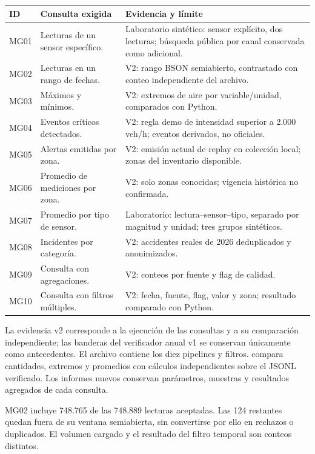 \begin{longtable}{>{\raggedright\arraybackslash}p{}>{\raggedright\arraybackslash}p{}>{\raggedright\arraybackslash}p{}}
\toprule ID & Consulta exigida & Evidencia y límite \\
\midrule\endhead
MG01 & Lecturas de un sensor específico. & Laboratorio sintético: sensor explícito, dos lecturas; búsqueda pública por canal conservada como adicional. \\
MG02 & Lecturas en un rango de fechas. & V2: rango BSON semiabierto, contrastado con conteo independiente del archivo. \\
MG03 & Máximos y mínimos. & V2: extremos de aire por variable/unidad, comparados con Python. \\
MG04 & Eventos críticos detectados. & V2: regla demo de intensidad superior a 2.000 veh/h; eventos derivados, no oficiales. \\
MG05 & Alertas emitidas por zona. & V2: emisión actual de replay en colección local; zonas del inventario disponible. \\
MG06 & Promedio de mediciones por zona. & V2: solo zonas conocidas; vigencia histórica no confirmada. \\
MG07 & Promedio por tipo de sensor. & Laboratorio: lectura--sensor--tipo, separado por magnitud y unidad; tres grupos sintéticos. \\
MG08 & Incidentes por categoría. & V2: accidentes reales de 2026 deduplicados y anonimizados. \\
MG09 & Consulta con agregaciones. & V2: conteos por fuente y flag de calidad. \\
MG10 & Consulta con filtros múltiples. & V2: fecha, fuente, flag, valor y zona; resultado comparado con Python. \\
\bottomrule
\end{longtable}

La evidencia v2 corresponde a la ejecución de las consultas y a su comparación
independiente; las banderas del verificador anual v1 se conservan únicamente
como antecedentes. El archivo
 contiene los diez pipelines y
filtros.  compara cantidades, extremos y promedios
con cálculos independientes sobre el JSONL verificado. Los informes nuevos
conservan parámetros, muestras y resultados agregados de cada consulta.

MG02 incluye 748.765 de las 748.889 lecturas aceptadas. Las 124 restantes quedan
fuera de su ventana semiabierta, sin convertirse por ello en rechazos o duplicados.
El volumen cargado y el resultado del filtro temporal son conteos distintos.

